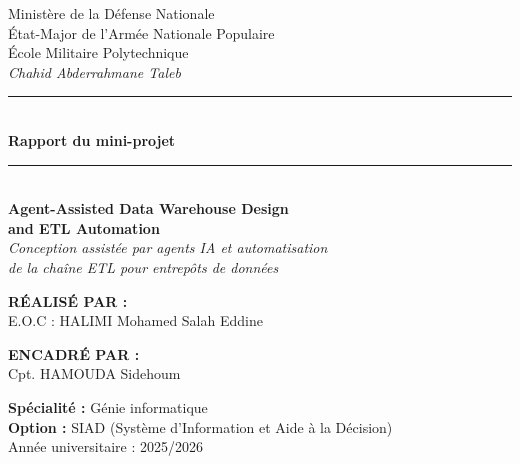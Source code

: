 \documentclass[12pt, a4paper]{report}
\begin{document}
\begin{titlepage}
  \centering
  \vspace*{0.5cm}
  {\large Ministère de la Défense Nationale}\\[0.3cm]
  {\large État-Major de l'Armée Nationale Populaire}\\[0.3cm]
  {\large École Militaire Polytechnique}\\[0.2cm]
  {\large \textit{Chahid Abderrahmane Taleb}}\\[1.5cm]

  \rule{\linewidth}{0.5mm}\\[0.4cm]
  {\Huge \bfseries Rapport du mini-projet}\\[0.4cm]
  \rule{\linewidth}{0.5mm}\\[1.2cm]

  {\LARGE \bfseries Agent-Assisted Data Warehouse Design\\[0.2cm] and ETL Automation}\\[0.5cm]

  \vspace{1cm}
  {\large \textit{Conception assistée par agents IA et automatisation\\
  de la chaîne ETL pour entrepôts de données}}\\[1.5cm]

  \begin{minipage}{0.45\textwidth}
    \begin{flushleft}\large
      \textbf{RÉALISÉ PAR :}\\[0.3cm]
      E.O.C : HALIMI Mohamed Salah Eddine
    \end{flushleft}
  \end{minipage}
  \hfill
  \begin{minipage}{0.45\textwidth}
    \begin{flushright}\large
      \textbf{ENCADRÉ PAR :}\\[0.3cm]
      Cpt. HAMOUDA Sidehoum
    \end{flushright}
  \end{minipage}

  \vfill
  {\large \textbf{Spécialité :} Génie informatique}\\[0.2cm]
  {\large \textbf{Option :} SIAD (Système d'Information et Aide à la Décision)}\\[1cm]
  {\large Année universitaire : 2025/2026}
\end{titlepage}
\end{document}

